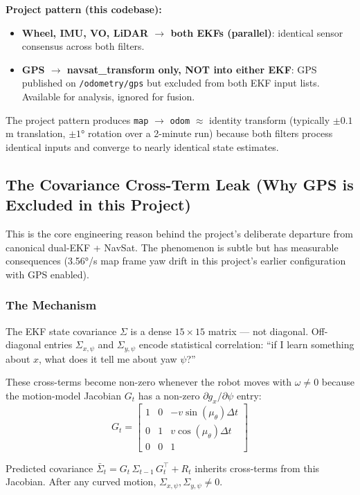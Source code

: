 \documentclass[11pt,a4paper]{article}
\begin{document}
\textbf{Project pattern (this codebase):}
\begin{itemize}
\item \textbf{Wheel, IMU, VO, LiDAR $\to$ both EKFs (parallel)}: identical sensor consensus across both filters.
\item \textbf{GPS $\to$ navsat\_transform only, NOT into either EKF}: GPS published on \texttt{/odometry/gps} but excluded from both EKF input lists. Available for analysis, ignored for fusion.
\end{itemize}

The project pattern produces \texttt{map} $\to$ \texttt{odom} $\approx$ identity transform (typically $\pm 0.1$ m translation, $\pm 1°$ rotation over a 2-minute run) because both filters process identical inputs and converge to nearly identical state estimates.

\subsection{The Covariance Cross-Term Leak (Why GPS is Excluded in this Project)}
\label{sec:covariance-leak}

This is the core engineering reason behind the project's deliberate departure from canonical dual-EKF + NavSat. The phenomenon is subtle but has measurable consequences (3.56°/s map frame yaw drift in this project's earlier configuration with GPS enabled).

\subsubsection{The Mechanism}

The EKF state covariance $\Sigma$ is a dense $15 \times 15$ matrix --- not diagonal. Off-diagonal entries $\Sigma_{x,\psi}$ and $\Sigma_{y,\psi}$ encode statistical correlation: ``if I learn something about $x$, what does it tell me about yaw $\psi$?''

These cross-terms become non-zero whenever the robot moves with $\omega \neq 0$ because the motion-model Jacobian $G_t$ has a non-zero $\partial g_x / \partial \psi$ entry:
\[
G_t = \begin{bmatrix} 1 & 0 & -v\sin(\mu_\theta)\Delta t \\ 0 & 1 & v\cos(\mu_\theta)\Delta t \\ 0 & 0 & 1 \end{bmatrix}
\]

Predicted covariance $\bar{\Sigma}_t = G_t\,\Sigma_{t-1}\,G_t^\top + R_t$ inherits cross-terms from this Jacobian. After any curved motion, $\Sigma_{x,\psi}, \Sigma_{y,\psi} \neq 0$.
\end{document}
